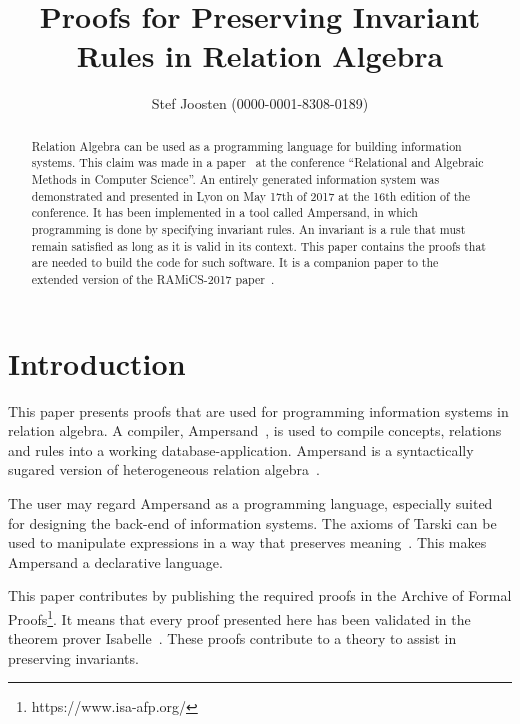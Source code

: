 \documentclass[11pt,a4paper]{article}
\begin{document}
\title{Proofs for Preserving Invariant Rules in Relation Algebra}
\author{Stef Joosten (0000-0001-8308-0189)}
\maketitle

\begin{abstract}
	Relation Algebra can be used as a programming language for building information systems.
	This claim was made in a paper~\cite{JoostenRAMiCS2017} at the conference
	``Relational and Algebraic Methods in Computer Science''.
	An entirely generated information system was demonstrated and presented in Lyon on May 17th of 2017 at the 16th edition of the conference.
	It has been implemented in a tool called Ampersand,
	in which programming is done by specifying invariant rules.
	An invariant is a rule that must remain satisfied as long as it is valid in its context.
	This paper contains the proofs that are needed to build the code for such software.
	It is a companion paper to the extended version of the RAMiCS-2017 paper~\cite{Joosten-AFP17}.
\end{abstract}

\tableofcontents

\section{Introduction}
\label{sct:Introduction}
	This paper presents proofs that are used for programming information systems in relation algebra.
	A compiler, Ampersand~\cite{Michels2011}, is used to compile concepts, relations and rules into a working database-application.
	Ampersand is a syntactically sugared version of heterogeneous relation algebra~\cite{Schmidt1997}.
	
	The user may regard Ampersand as a programming language, especially suited for designing the back-end of information systems.
	The axioms of Tarski can be used to manipulate expressions in a way that preserves meaning~\cite{vdWoude2011}.
	This makes Ampersand a declarative language.

	This paper contributes by publishing the required proofs in the Archive of Formal Proofs\footnote{https://www.isa-afp.org/}.
	It means that every proof presented here has been validated in the theorem prover Isabelle~\cite{Nipkow2002}.
	These proofs contribute to a theory to assist in preserving invariants.





\end{document}
